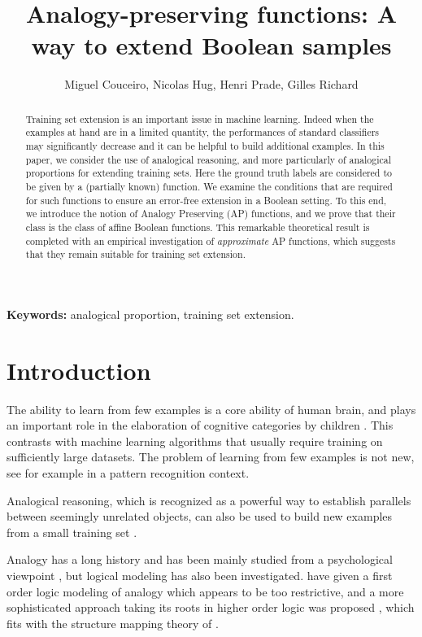 \documentclass[article]{amsart}
\title{Analogy-preserving functions: A way to extend Boolean samples}
\author{Miguel Couceiro, Nicolas Hug, Henri Prade, Gilles Richard}
\begin{document}
\maketitle

\begin{abstract}
Training set extension is an important issue in machine learning. Indeed 
  when the examples at hand are in a limited quantity, the performances of
  standard classifiers may significantly decrease and it can be helpful to
  build additional examples. In this paper, we consider the use of analogical
  reasoning, and more particularly of analogical proportions for extending
  training sets. Here the ground truth labels are considered to be given by a
  (partially known) function.  We examine the conditions that are required for
  such functions to ensure an error-free extension in a Boolean setting. To
  this end, we introduce the notion of Analogy Preserving (AP) functions, and
  we prove that their class is the class of affine Boolean functions. This
  remarkable theoretical result is completed with an empirical investigation of
  \textit{approximate} AP functions, which suggests that they remain suitable
  for training set extension.
\end{abstract}

{\bf Keywords:} analogical proportion, training set extension.

\maketitle
\section{Introduction}
The ability to learn from few examples is a core ability of human brain, and
plays an important role in the elaboration of cognitive categories by children
\cite{GenHolKok2001}.  This contrasts with machine learning algorithms that
usually require training on sufficiently large datasets. The problem of
learning from few examples is not new, see  for example \cite{LiFerPerPAMI2006}
in a pattern recognition context.

Analogical reasoning, which is recognized as a powerful way to establish
parallels between seemingly unrelated objects, can also be used to build new
examples from a small training set \cite{BayMouMicAnqECML2007}.

Analogy has a long history and has been mainly studied from a psychological
viewpoint \cite{DasIndScha2003,Gentner1983}, but logical modeling has also been
investigated.  \cite{DavRus1987} have given a first order logic modeling of analogy 
which appears to be too restrictive, and a more sophisticated approach taking its
roots in higher order logic was proposed \cite{GusKuhSchTCS2006}, which fits
with the structure mapping theory  of \cite{Gentner1983}.
\end{document}
